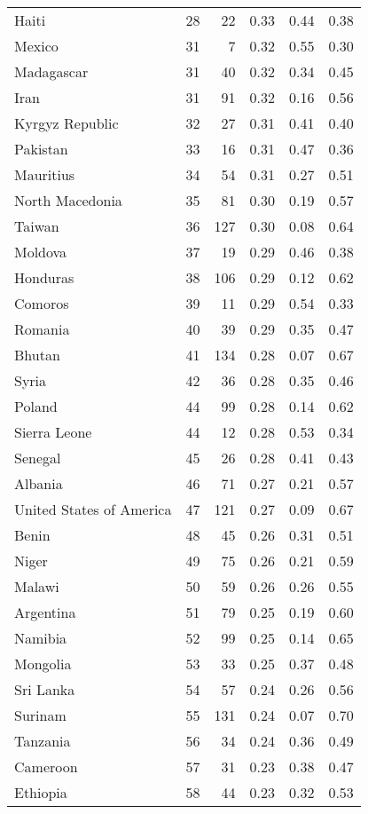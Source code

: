 \begin{longtable}[t]{lrrrrr}
Haiti & 28 & 22 & 0.33 & 0.44 & 0.38\\
Mexico & 31 & 7 & 0.32 & 0.55 & 0.30\\
Madagascar & 31 & 40 & 0.32 & 0.34 & 0.45\\
\addlinespace
Iran & 31 & 91 & 0.32 & 0.16 & 0.56\\
Kyrgyz Republic & 32 & 27 & 0.31 & 0.41 & 0.40\\
Pakistan & 33 & 16 & 0.31 & 0.47 & 0.36\\
Mauritius & 34 & 54 & 0.31 & 0.27 & 0.51\\
North Macedonia & 35 & 81 & 0.30 & 0.19 & 0.57\\
\addlinespace
Taiwan & 36 & 127 & 0.30 & 0.08 & 0.64\\
Moldova & 37 & 19 & 0.29 & 0.46 & 0.38\\
Honduras & 38 & 106 & 0.29 & 0.12 & 0.62\\
Comoros & 39 & 11 & 0.29 & 0.54 & 0.33\\
Romania & 40 & 39 & 0.29 & 0.35 & 0.47\\
\addlinespace
Bhutan & 41 & 134 & 0.28 & 0.07 & 0.67\\
Syria & 42 & 36 & 0.28 & 0.35 & 0.46\\
Poland & 44 & 99 & 0.28 & 0.14 & 0.62\\
Sierra Leone & 44 & 12 & 0.28 & 0.53 & 0.34\\
Senegal & 45 & 26 & 0.28 & 0.41 & 0.43\\
\addlinespace
Albania & 46 & 71 & 0.27 & 0.21 & 0.57\\
United States of America & 47 & 121 & 0.27 & 0.09 & 0.67\\
Benin & 48 & 45 & 0.26 & 0.31 & 0.51\\
Niger & 49 & 75 & 0.26 & 0.21 & 0.59\\
Malawi & 50 & 59 & 0.26 & 0.26 & 0.55\\
\addlinespace
Argentina & 51 & 79 & 0.25 & 0.19 & 0.60\\
Namibia & 52 & 99 & 0.25 & 0.14 & 0.65\\
Mongolia & 53 & 33 & 0.25 & 0.37 & 0.48\\
Sri Lanka & 54 & 57 & 0.24 & 0.26 & 0.56\\
Surinam & 55 & 131 & 0.24 & 0.07 & 0.70\\
\addlinespace
Tanzania & 56 & 34 & 0.24 & 0.36 & 0.49\\
Cameroon & 57 & 31 & 0.23 & 0.38 & 0.47\\
Ethiopia & 58 & 44 & 0.23 & 0.32 & 0.53\\

\end{longtable}
